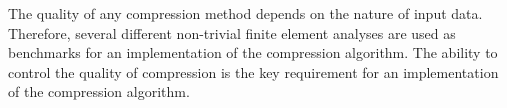 The quality of any compression method depends on the nature of input data. Therefore, several different non-trivial finite element analyses are used as benchmarks for an implementation of the compression algorithm. The ability to control the quality of compression is the key requirement for an implementation of the compression algorithm.

